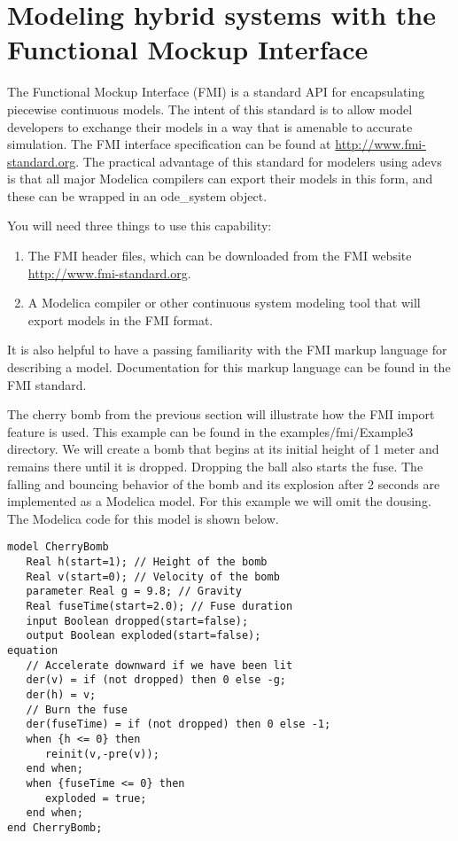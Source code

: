 \section{Modeling hybrid systems with the Functional Mockup Interface}
\label{sect:fmi}
The Functional Mockup Interface (FMI) is a standard API for encapsulating piecewise continuous models. The intent of this standard is to allow model developers to exchange their models in a way that is amenable to accurate simulation. The FMI interface specification can be found at \url{http://www.fmi-standard.org}. The practical advantage of this standard for modelers using adevs is that all major Modelica compilers can export their models in this form, and these can be wrapped in an ode\_system object.

You will need three things to use this capability:
\begin{enumerate}
\item The FMI header files, which can be downloaded from the FMI website \url{http://www.fmi-standard.org}.
\item A Modelica compiler or other continuous system modeling tool that will export models in the FMI format.
\end{enumerate}
It is also helpful to have a passing familiarity with the FMI markup language for describing a model. Documentation for this markup language can be found in the FMI standard.

The cherry bomb from the previous section will illustrate how the FMI import feature is used. This example can be found in the examples/fmi/Example3 directory. We will create a bomb that begins at its initial height of 1 meter and remains there until it is dropped. Dropping the ball also starts the fuse. The falling and bouncing behavior of the bomb and its explosion after 2 seconds are implemented as a Modelica model. For this example we will omit the dousing. The Modelica code for this model is shown below.
\begin{verbatim}
model CherryBomb
   Real h(start=1); // Height of the bomb
   Real v(start=0); // Velocity of the bomb
   parameter Real g = 9.8; // Gravity
   Real fuseTime(start=2.0); // Fuse duration
   input Boolean dropped(start=false); 
   output Boolean exploded(start=false);
equation
   // Accelerate downward if we have been lit
   der(v) = if (not dropped) then 0 else -g;
   der(h) = v;
   // Burn the fuse
   der(fuseTime) = if (not dropped) then 0 else -1;
   when {h <= 0} then
      reinit(v,-pre(v));
   end when;
   when {fuseTime <= 0} then
      exploded = true;
   end when;
end CherryBomb;
\end{verbatim}

